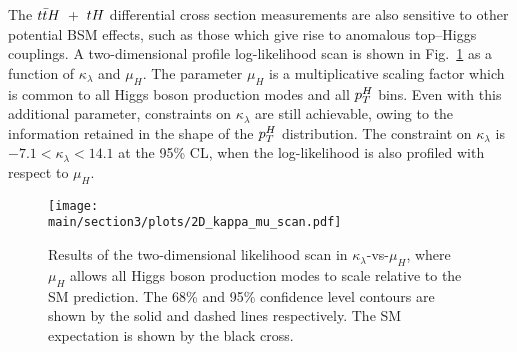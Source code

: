 The $t\bar{t}H$~+~$tH$ differential cross section measurements are also sensitive to other potential BSM effects, such as those which give rise to anomalous top--Higgs couplings. A two-dimensional profile log-likelihood scan is shown in  Fig.~\ref{fig:ttHdiff_CMS_klambda_2Dscan} as a function of $\kappa_\lambda$ and $\mu_{H}$. The parameter $\mu_{H}$ is a multiplicative scaling factor which is common to all Higgs boson production modes and all $p_{T}^{H}$ bins. Even with this additional parameter, constraints on $\kappa_\lambda$ are still achievable, owing to the information retained in the shape of the $p_{T}^{H}$ distribution. The constraint on $\kappa_\lambda$ is $-7.1 < \kappa_\lambda < 14.1$ at the 95\% CL, when the log-likelihood is also profiled with respect to $\mu_{H}$. 

\begin{figure}[htb!]
        \centering
        \texttt{[image: \\main/section3/plots/2D\_kappa\_mu\_scan.pdf]}
        \caption{Results of the two-dimensional likelihood scan in $\kappa_\lambda$-vs-$\mu_{H}$, where $\mu_{H}$ allows all Higgs boson production modes to scale relative to the SM prediction. The 68\% and 95\% confidence level contours are shown by the solid and dashed lines respectively. The SM expectation is shown by the black cross.}
        \label{fig:ttHdiff_CMS_klambda_2Dscan}
\end{figure}


